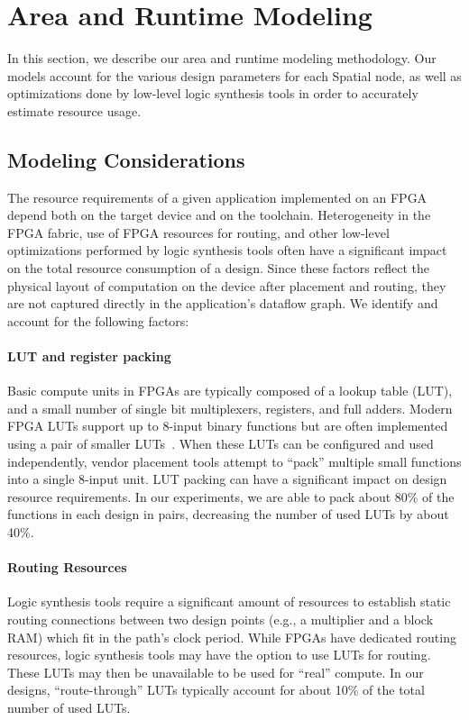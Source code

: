 \section{Area and Runtime Modeling}
\label{sec:modeling}
In this section, we describe our area and runtime modeling methodology. Our models account for the various
design parameters for each Spatial node, as well as optimizations done by low-level logic
synthesis tools in order to accurately estimate resource usage.

\subsection{Modeling Considerations}
\label{ss:modeling-con}
The resource requirements of a given application implemented on an
FPGA depend both on the target device and on the toolchain.
Heterogeneity in the FPGA fabric, use of FPGA resources for routing,
and other low-level optimizations performed by logic synthesis tools often have
a significant impact on the total resource consumption of a design.
Since these factors reflect the physical layout of computation on the device
after placement and routing, they are not captured directly in the application's dataflow graph.
We identify and account for the following factors:

\paragraph{LUT and register packing} Basic compute units in FPGAs are typically composed of a lookup table (LUT), and a small number of single bit multiplexers, registers, and full adders.
  Modern FPGA LUTs support up to 8-input binary functions but are often implemented using a pair of smaller LUTs~\cite{stratixv,virtex7}.
  When these LUTs can be configured and used independently, vendor placement tools attempt to ``pack'' multiple small functions into a single 8-input unit.
  LUT packing can have a significant impact on design resource requirements.
  In our experiments, we are able to pack about 80\% of the functions in each design in pairs, decreasing the number of used LUTs by about 40\%.

\paragraph{Routing Resources} Logic synthesis tools require a significant amount of resources to establish static routing connections
between two design points (e.g., a multiplier and a block RAM) which fit in the path's clock period. While FPGAs have dedicated routing resources,
logic synthesis tools may have the option to use LUTs for routing. These LUTs may then be unavailable to be used for ``real'' compute.
In our designs, ``route-through'' LUTs typically account for about 10\% of the total number of used LUTs.


